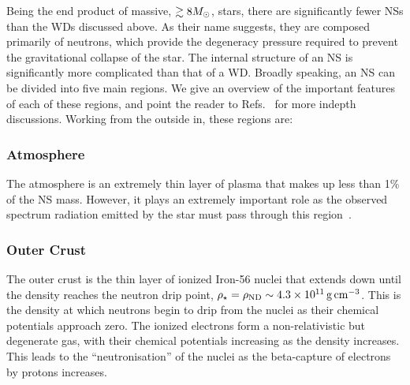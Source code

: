 Being the end product of massive, $\gtrsim 8 M_\odot$, stars, there are significantly fewer NSs than the WDs discussed above. As their name suggests, they are composed primarily of neutrons, which provide the degeneracy pressure required to prevent the gravitational collapse of the star.
The internal structure of an NS is significantly more complicated than that of a WD. Broadly speaking, an NS can be divided into five main regions. We give an overview of the important features of each of these regions, and point the reader to Refs.~\cite{Glendenning_Compactstarsnuclear, Lattimer:2004pg_Physicsneutronstars, Haensel_NeutronstarsEqation, Weber:2007ch_may_NeutronStarInteriors, Camenzind_Compactobjectsastrophysics, Ozel:2015fia_mar_DenseMatterEquation,Ozel:2016oaf_jul_MassesRadiiEquation,Lattimer:2021emm_jul_NeutronStarsNuclear} for more indepth discussions. Working from the outside in, these regions are:

\subsubsection*{Atmosphere}
The atmosphere is an extremely thin layer of plasma that makes up less than 1\% of the NS mass. However, it plays an extremely important role as the observed spectrum radiation emitted by the star must pass through this region~\cite{Lattimer:2004pg_Physicsneutronstars, Haensel_NeutronstarsEqation}.

\subsubsection*{Outer Crust}
The outer crust is the thin layer of ionized Iron-56 nuclei that extends down until the density reaches the neutron drip point, $\rho_\star = \rho_\mathrm{ND} \sim 4.3\times 10^{11}{\rm \,g}{\rm \,cm}^{-3}$. This is the density at which neutrons begin to drip from the nuclei as their chemical potentials approach zero. The ionized electrons form a non-relativistic but degenerate gas, with their chemical potentials increasing as the density increases. This leads to the ``neutronisation'' of the nuclei as the beta-capture of electrons by protons increases.

